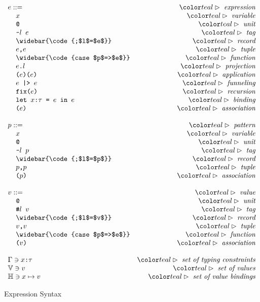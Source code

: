 \documentclass[acmsmall]{acmart}
\theoremstyle{definition}
\begin{document}
\begin{figure*}[h]
\[
\begin{array}[t]{l r}
  e ::= &\C{expression}
  \\
  \I \code{$x$} &\C{variable}
  \\
  \I \code{@} &\C{unit}
  \\
  \I \code{\textasciitilde{}$l$ $e$} &\C{tag}
  \\
  \I \widebar{\code{;$l$=$e$}} &\C{record}
  \\
  \I \code{$e$,$e$} &\C{tuple}
  \\
  \I \widebar{\code{case $p$=>$e$}} &\C{function}
  \\
  \I \code{$e$.$l$} &\C{projection}
  \\
  \I \code{($e$)($e$)} &\C{application}
  \\
  \I \code{$e$ |> $e$} &\C{funneling}
  \\
  \I \code{fix($e$)} &\C{recursion}
  \\
  \I \code{let $x$:$\tau$ = $e$ in $e$} &\C{binding}
  \\
  \I \code{($e$)} &\C{association}
  \\
  \\
p ::= &\C{pattern}
  \\
  \I \code{$x$} &\C{variable}
  \\
  \I \code{@} &\C{unit}
  \\
  \I \code{\textasciitilde{}$l$ $p$} &\C{tag}
  \\
  \I \widebar{\code{;$l$=$p$}} &\C{record}
  \\
  \I \code{$p$,$p$} &\C{tuple}
  \\
  \I \code{($p$)} &\C{association}
  \\
  \\
v ::= &\C{value}
  \\
  \I \code{@} &\C{unit}
  \\
  \I \code{\#$l$ $v$}  &\C{tag}
  \\
  \I \widebar{\code{;$l$=$v$}} &\C{record}
  \\
  \I \code{$v$,$v$} &\C{tuple}
  \\
  \I \widebar{\code{case $p$=>$e$}} &\C{function}
  \\
  \I \code{($v$)} &\C{association}
  \\
  \\
  \Gamma \owns \code{$x$:$\tau$} &\C{set of typing constraints}
  \\
  \mathbb{V} \owns v &\C{set of values}
  \\
  \mathbb{H} \owns x \mapsto v &\C{set of value bindings}
\end{array}
\]

\caption{Expression Syntax}
\label{fig:expr_syntax}
\end{figure*}
\end{document}
